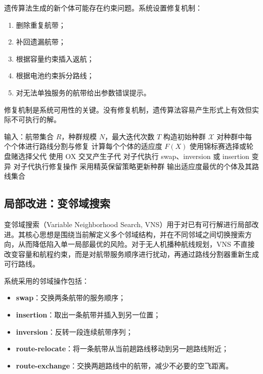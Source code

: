 \documentclass[UTF8,a4paper,12pt]{ctexart}
\begin{document}
遗传算法生成的新个体可能存在约束问题。系统设置修复机制：

\begin{enumerate}
    \item 删除重复航带；
    \item 补回遗漏航带；
    \item 根据容量约束插入返航；
    \item 根据电池约束拆分路线；
    \item 对无法单独服务的航带给出参数错误提示。
\end{enumerate}

修复机制是系统可用性的关键。没有修复机制，遗传算法容易产生形式上有效但实际不可执行的解。

\begin{algorithm}[H]
\caption{遗传算法主流程}
\begin{algorithmic}[1]
\State 输入：航带集合 \(R\)，种群规模 \(N\)，最大迭代次数 \(T\)
\State 构造初始种群 \(\mathcal{X}\)
    \State 对种群中每个个体进行路线分割与修复
    \State 计算每个个体的适应度 \(F(X)\)
    \State 使用锦标赛选择或轮盘赌选择父代
    \State 使用 OX 交叉产生子代
    \State 对子代执行 swap、inversion 或 insertion 变异
    \State 对子代执行修复操作
    \State 采用精英保留策略更新种群
\EndFor
\State 输出适应度最优的个体及其路线集合
\end{algorithmic}
\end{algorithm}

\subsection{局部改进：变邻域搜索}

变邻域搜索（Variable Neighborhood Search, VNS）用于对已有可行解进行局部改进。其核心思想是围绕当前解定义多个邻域结构，并在不同邻域之间切换搜索方向，从而降低陷入单一局部最优的风险。对于无人机播种航线规划，VNS 不直接改变容量和航程约束，而是对航带服务顺序进行扰动，再通过路线分割器重新生成可行路线。

系统采用的邻域操作包括：

\begin{itemize}
    \item \textbf{swap}：交换两条航带的服务顺序；
    \item \textbf{insertion}：取出一条航带并插入到另一位置；
    \item \textbf{inversion}：反转一段连续航带序列；
    \item \textbf{route-relocate}：将一条航带从当前趟路线移动到另一趟路线附近；
    \item \textbf{route-exchange}：交换两趟路线中的航带，减少不必要的空飞距离。
\end{itemize}
\end{document}
